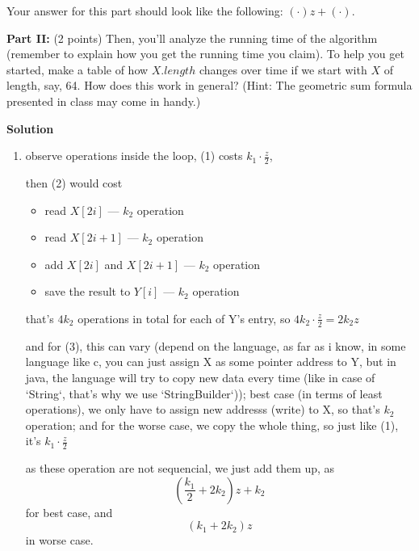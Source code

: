 \documentclass{article}
\newcommand{\solution}{\textbf{\large Solution}}
\theoremstyle{remark}
\begin{document}
Your answer for this part should look like the following: $(\cdot)z + (\cdot)$.

\textbf{Part II:} (2 points) Then, you’ll analyze the running time of the algorithm (remember to explain how you get the running time you claim). To help you get started, make a table of how $X.length$ changes over time if we start with $X$ of length, say, 64. How does this work in general? (Hint: The geometric sum formula presented in class may come in handy.)

\medskip
\solution

\begin{enumerate}
    \item observe operations inside the loop, (1) costs $k_1\cdot \frac{z}{2}$, 

        \vspace{1em}

        then (2) would cost
        \begin{itemize}
            \item read $X[2i]$ \hfill --- $k_2$ operation
            \item read $X[2i+1]$ \hfill --- $k_2$ operation
            \item add $X[2i]$ and $X[2i+1]$ \hfill --- $k_2$ operation
            \item save the result to $Y[i]$ \hfill --- $k_2$ operation
        \end{itemize}

        that's $4k_2$ operations in total for each of Y's entry, so $4k_2 \cdot \frac{z}{2} = 2k_2z$

        \vspace{1em}

        and for (3), this can vary (depend on the language, as far as i know, in some language like c, you can just assign X as some pointer address to Y, but in java, the language will try to copy new data every time (like in case of `String`, that's why we use `StringBuilder`)); best case (in terms of least operations), we only have to assign new addresss (write) to X, so that's $k_2$ operation; and for the worse case, we copy the whole thing, so just like (1), it's $k_1 \cdot \frac{z}{2}$
        
        \vspace{1em}

        as these operation are not sequencial, we just add them up, as 
        \[
        \boxed{\left(\frac{k_1}{2} + 2k_2\right)z + k_2}
        \]
        for best case, and 
        \[
        \boxed{\left(k_1 + 2k_2\right)z}
        \]
        in worse case. 



\end{enumerate}
\end{document}

